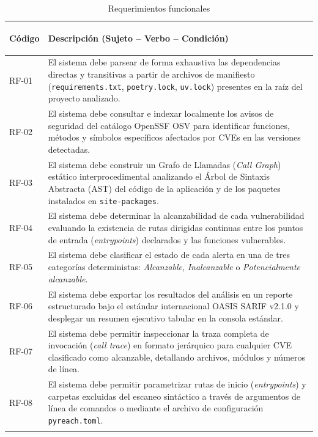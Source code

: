 \begin{table}[H]
\centering
\caption{Requerimientos funcionales}
\label{tab:req_funcionales}
\small
{}
\begin{tabularx}{\textwidth}{>{\bfseries\raggedright\arraybackslash}p{2.0cm} X}
\toprule
\textbf{Código} & \textbf{Descripción (Sujeto -- Verbo -- Condición)} \\
\midrule
RF-01 & El sistema debe parsear de forma exhaustiva las dependencias directas y transitivas a partir de archivos de manifiesto (\texttt{requirements.txt}, \texttt{poetry.lock}, \texttt{uv.lock}) presentes en la raíz del proyecto analizado. \\
\addlinespace
RF-02 & El sistema debe consultar e indexar localmente los avisos de seguridad del catálogo OpenSSF OSV para identificar funciones, métodos y símbolos específicos afectados por CVEs en las versiones detectadas. \\
\addlinespace
RF-03 & El sistema debe construir un Grafo de Llamadas (\textit{Call Graph}) estático interprocedimental analizando el Árbol de Sintaxis Abstracta (AST) del código de la aplicación y de los paquetes instalados en \texttt{site-packages}. \\
\addlinespace
RF-04 & El sistema debe determinar la alcanzabilidad de cada vulnerabilidad evaluando la existencia de rutas dirigidas continuas entre los puntos de entrada (\textit{entrypoints}) declarados y las funciones vulnerables. \\
\addlinespace
RF-05 & El sistema debe clasificar el estado de cada alerta en una de tres categorías deterministas: \textit{Alcanzable}, \textit{Inalcanzable} o \textit{Potencialmente alcanzable}. \\
\addlinespace
RF-06 & El sistema debe exportar los resultados del análisis en un reporte estructurado bajo el estándar internacional OASIS SARIF v2.1.0 y desplegar un resumen ejecutivo tabular en la consola estándar. \\
\addlinespace
RF-07 & El sistema debe permitir inspeccionar la traza completa de invocación (\textit{call trace}) en formato jerárquico para cualquier CVE clasificado como alcanzable, detallando archivos, módulos y números de línea. \\
\addlinespace
RF-08 & El sistema debe permitir parametrizar rutas de inicio (\textit{entrypoints}) y carpetas excluidas del escaneo sintáctico a través de argumentos de línea de comandos o mediante el archivo de configuración \texttt{pyreach.toml}. \\
\addlinespace

\end{tabularx}
\end{table}
